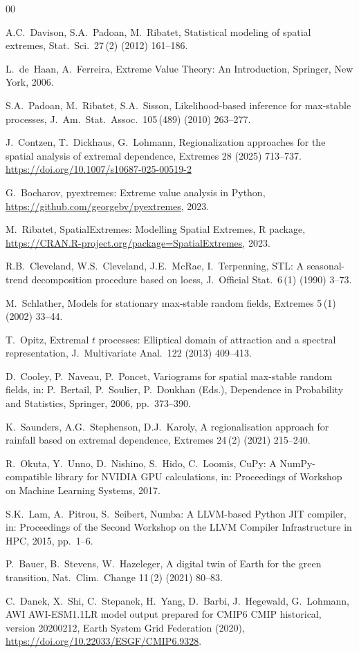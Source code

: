 \documentclass[preprint,12pt,a4paper]{elsarticle}
\newcommand{\rev}[1]{{#1}}
\begin{document}
\begin{thebibliography}{00}

A.C.~Davison, S.A.~Padoan, M.~Ribatet,
Statistical modeling of spatial extremes,
Stat.\ Sci.\ 27\,(2) (2012) 161--186.

L.~de~Haan, A.~Ferreira,
Extreme Value Theory: An Introduction,
Springer, New York, 2006.

S.A.~Padoan, M.~Ribatet, S.A.~Sisson,
Likelihood-based inference for max-stable processes,
J.\ Am.\ Stat.\ Assoc.\ 105\,(489) (2010) 263--277.

\rev{J.~Contzen, T.~Dickhaus, G.~Lohmann,
Regionalization approaches for the spatial analysis of extremal
dependence,
Extremes 28 (2025) 713--737.
\url{https://doi.org/10.1007/s10687-025-00519-2}}

G.~Bocharov,
pyextremes: Extreme value analysis in Python,
\url{https://github.com/georgebv/pyextremes}, 2023.

M.~Ribatet,
SpatialExtremes: Modelling Spatial Extremes,
R package, \url{https://CRAN.R-project.org/package=SpatialExtremes}, 2023.

\rev{R.B.~Cleveland, W.S.~Cleveland, J.E.~McRae, I.~Terpenning,
STL: A seasonal-trend decomposition procedure based on loess,
J.\ Official Stat.\ 6\,(1) (1990) 3--73.}

M.~Schlather,
Models for stationary max-stable random fields,
Extremes 5\,(1) (2002) 33--44.

T.~Opitz,
Extremal $t$ processes: Elliptical domain of attraction and a
spectral representation,
J.\ Multivariate Anal.\ 122 (2013) 409--413.

D.~Cooley, P.~Naveau, P.~Poncet,
Variograms for spatial max-stable random fields,
in: P.~Bertail, P.~Soulier, P.~Doukhan (Eds.),
Dependence in Probability and Statistics,
Springer, 2006, pp.~373--390.

K.~Saunders, A.G.~Stephenson, D.J.~Karoly,
A regionalisation approach for rainfall based on extremal dependence,
Extremes 24\,(2) (2021) 215--240.

R.~Okuta, Y.~Unno, D.~Nishino, S.~Hido, C.~Loomis,
CuPy: A NumPy-compatible library for NVIDIA GPU calculations,
in: Proceedings of Workshop on Machine Learning Systems,
2017.

S.K.~Lam, A.~Pitrou, S.~Seibert,
Numba: A LLVM-based Python JIT compiler,
in: Proceedings of the Second Workshop on the LLVM Compiler
Infrastructure in HPC,
2015, pp.~1--6.

P.~Bauer, B.~Stevens, W.~Hazeleger,
A digital twin of Earth for the green transition,
Nat.\ Clim.\ Change 11\,(2) (2021) 80--83.

C.~Danek, X.~Shi, C.~Stepanek, H.~Yang, D.~Barbi, J.~Hegewald,
G.~Lohmann,
AWI AWI-ESM1.1LR model output prepared for CMIP6 CMIP historical,
version 20200212, Earth System Grid Federation (2020),
\url{https://doi.org/10.22033/ESGF/CMIP6.9328}.

\end{thebibliography}
\end{document}
